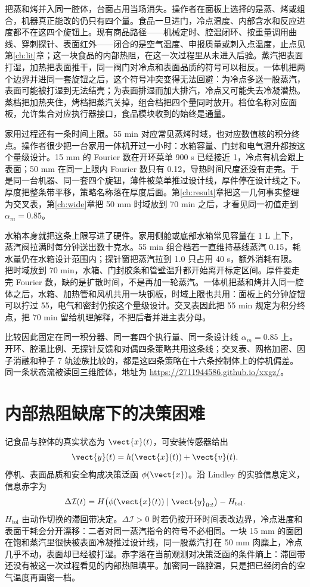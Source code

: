 把蒸和烤并入同一腔体，台面占用当场消失。操作者在面板上选择的是蒸、烤或组合，机器真正能改的仍只有四个量。食品一旦进门，冷点温度、内部含水和反应进度都不在这四个旋钮上。现有商品路径——机械定时、腔温闭环、按重量调用曲线、穿刺探针、表面红外——闭合的是空气温度、申报质量或刺入点温度，止点见第\ref{ch:lit}章；这一块食品的内部热阻，在这一次过程里从未进入后验。蒸汽把表面打湿，加热把表面推干，同一阀门对冷点和表面品质的符号可以相反。一体机把两个边界并进同一套旋钮之后，这个符号冲突变得无法回避：为冷点多送一股蒸汽，表面可能被打湿到无法结壳；为表面排湿而加大排汽，冷点又可能失去冷凝潜热。蒸档把加热夹住，烤档把蒸汽关掉，组合档把四个量同时放开。档位名称对应面板，允许集合对应执行器接口，食品模块收到的始终是通量。

家用过程还有一条时间上限。55 min 对应常见蒸烤时域，也对应数值核的积分终点。操作者很少把一台家用一体机开过一小时：水箱容量、门封和电气温升都按这个量级设计。15 mm 的 Fourier 数在开环菜单 900 s 已经接近 1，冷点有机会跟上表面；50 mm 在同一上限内 Fourier 数只有 0.12，导热时间尺度还没有走完。于是同一台机器、同一套四个旋钮，薄件被菜单推过设计线，厚件停在设计线之下。厚度把整条带平移，策略名称落在厚度后面。第\ref{ch:result}章把这一几何事实整理为交叉表，第\ref{ch:wide}章把 50 mm 时域放到 70 min 之后，才看见同一初值走到 \(\alpha_m=0.85\)。

水箱本身就把这条上限写进了硬件。家用侧舱或底部水箱常见容量在 1 L 上下，蒸汽阀拉满时每分钟送出数十克水。55 min 组合档若一直维持基线蒸汽 0.15，耗水量仍在水箱设计范围内；探针窗把蒸汽拉到 1.0 只占用 40 s，额外消耗有限。把时域放到 70 min，水箱、门封胶条和管壁温升都开始离开标定区间。厚件要走完 Fourier 数，缺的是扩散时间，不是再加一轮蒸汽。一体机把蒸和烤并入同一腔体之后，水箱、加热管和风机共用一块钢板，时域上限也共用：面板上的分钟旋钮可以拧过 55，电气和密封仍按这个量级设计。交叉表因此把 55 min 规定为积分终点，把 70 min 留给机理解释，不把后者并进主表分母。

比较因此固定在同一积分器、同一套四个执行量、同一条设计线 \(\alpha_m=0.85\) 上。开环、腔温比例、无探针反馈和对偶四条策略共用这条线；交叉表、网格加密、因子消融和种子 7 轨迹族比较的，都是这四条策略在十六条控制体上的停机偏差。同一条状态流被读回三维腔体，地址为 \url{https://2711944586.github.io/xxgz/}。

\section{内部热阻缺席下的决策困难}

记食品与腔体的真实状态为 \(\vect{x}(t)\)，可安装传感器给出
\[
\vect{y}(t)=h(\vect{x}(t))+\vect{v}(t).
\]
停机、表面品质和安全构成决策泛函 \(\phi(\vect{x})\)。沿 Lindley 的实验信息定义\cite{lindley1956}，信息赤字为
\begin{equation}
\label{eq:deficit}
\Delta\mathcal{I}(t)=H\big(\phi(\vect{x}(t))\mid \vect{y}_{0:t}\big)-H_{\mathrm{tol}}.
\end{equation}
\(H_{\mathrm{tol}}\) 由动作切换的滞回带决定。\(\Delta\mathcal{I}>0\) 时若仍按开环时间表改边界，冷点进度和表面干耗会分开漂移：二者对同一蒸汽指令的符号不必相同。一块 15 mm 的面团在饱和蒸汽里很快被表面冷凝推过设计线，同一股蒸汽打在 50 mm 肉糜上，冷点几乎不动，表面却已经被打湿。赤字落在当前观测对决策泛函的条件熵上：滞回带还没有被这一次过程看见的内部热阻填平。加密同一路腔温，只是把已经闭合的空气温度再画密一档。

